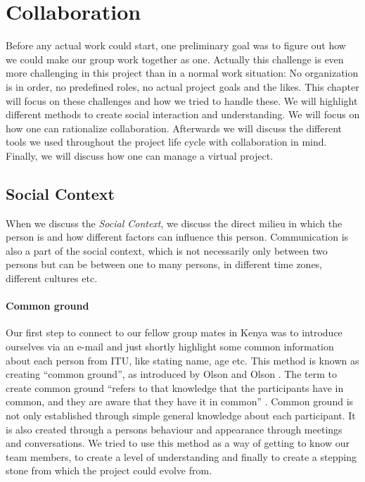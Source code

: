 \section{Collaboration} \label{sec:collaboration}
Before any actual work could start, one preliminary goal was to figure out how we could make our group work together as one. Actually this challenge is even more challenging in this project than in a normal work situation: No organization is in order, no predefined roles, no actual project goals and the likes. This chapter will focus on these challenges and how we tried to handle these. We will highlight different methods to create social interaction and understanding. We will focus on how one can rationalize collaboration. Afterwards we will discuss the different tools we used throughout the project life cycle with collaboration in mind. Finally, we will discuss how one can manage a virtual project.\\

\subsection{Social Context} \label{subsec:socialcontext}
When we discuss the \textit{Social Context}, we discuss the direct milieu in which the person is and how different factors can influence this person. Communication is also a part of the social context, which is not necessarily only between two persons but can be between one to many persons, in different time zones, different cultures etc.\\
\paragraph{Common ground} \label{par:commonground}
Our first step to connect to our fellow group mates in Kenya was to introduce ourselves via an e-mail and just shortly highlight some common information about each person from ITU, like stating name, age etc. This method is known as creating ``common ground'', as introduced by Olson and Olson \cite{olson:2000:distance}. The term to create common ground ``refers to that knowledge that the participants have in common, and they are aware that they have it in common'' \cite{olson:2000:distance}. Common ground is not only established through simple general knowledge about each participant. It is also created through a persons behaviour and appearance through meetings and conversations. We tried to use this method as a way of getting to know our team members, to create a level of understanding and finally to create a stepping stone from which the project could evolve from.

